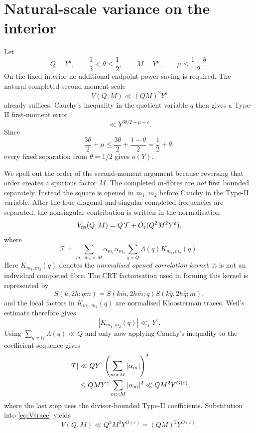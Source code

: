 \documentclass{aomart}
\theoremstyle{definition}
\newcommand{\eps}{\varepsilon}
\newcommand{\1}{\mathbf 1}
\begin{document}
\section{Natural-scale variance on the interior}

Let
\[
 Q=Y^\theta,\qquad \frac13<\theta\le\frac12,
 \qquad
 M=Y^\mu,\qquad \mu\le\frac{1-\theta}{2}.
\]
On the fixed interior no additional endpoint power saving is required.  The natural completed second-moment scale
\begin{equation}\label{eq:naturalvariance}
 V(Q,M)\ll(QM)^2Y^\eps
\end{equation}
already suffices.  Cauchy's inequality in the quotient variable $q$ then gives a Type-II first-moment error
\[
 \ll Y^{3\theta/2+\mu+\eps}.
\]
Since
\begin{equation}\label{eq:expinterior}
 \frac{3\theta}{2}+\mu
 \le\frac{3\theta}{2}+\frac{1-\theta}{2}
 =\frac12+\theta,
\end{equation}
every fixed separation from $\theta=1/2$ gives $o(Y)$.

We spell out the order of the second-moment argument because reversing that order creates a spurious factor $M$.  The completed $m$-fibres are \emph{not} first bounded separately.  Instead the square is opened in $m_1,m_2$ before Cauchy in the Type-II variable.  After the true diagonal and singular completed frequencies are separated, the nonsingular contribution is written in the normalisation
\begin{equation}\label{eq:Vtrace}
 V_{\rm ns}(Q,M)=Q\,\mathcal T+O_\eps(Q^2M^2Y^\eps),
\end{equation}
where
\begin{equation}\label{eq:Tkernel}
 \mathcal T=
 \sum_{m_1,m_2\asymp M}\alpha_{m_1}\overline{\alpha_{m_2}}
 \sum_{q\asymp Q}\Lambda(q)K_{m_1,m_2}(q).
\end{equation}
Here $K_{m_1,m_2}(q)$ denotes the \emph{normalised opened correlation kernel}; it is not an individual completed fibre.  The CRT factorisation used in forming this kernel is represented by
\begin{equation}\label{eq:KCRT}
 S(k,2h;qm)=S(k\bar m,2h\bar m;q)S(k\bar q,2h\bar q;m),
\end{equation}
and the local factors in $K_{m_1,m_2}(q)$ are normalised Kloosterman traces.  Weil's estimate therefore gives
\begin{equation}\label{eq:Kbound}
 |K_{m_1,m_2}(q)|\ll_\eps Y^\eps.
\end{equation}
Using $\sum_{q\asymp Q}\Lambda(q)\ll Q$ and only now applying Cauchy's inequality to the coefficient sequence gives
\begin{align}
 |\mathcal T|
 &\ll QY^\eps\left(\sum_{m\asymp M}|\alpha_m|\right)^2\notag\\
 &\le QMY^\eps\sum_{m\asymp M}|\alpha_m|^2
 \ll QM^2Y^{O(\eps)},\label{eq:Tbound}
\end{align}
where the last step uses the divisor-bounded Type-II coefficients.  Substitution into \eqref{eq:Vtrace} yields
\begin{equation}\label{eq:variancefinal}
 V(Q,M)\ll Q^2M^2Y^{O(\eps)}=(QM)^2Y^{O(\eps)}.
\end{equation}
\end{document}
